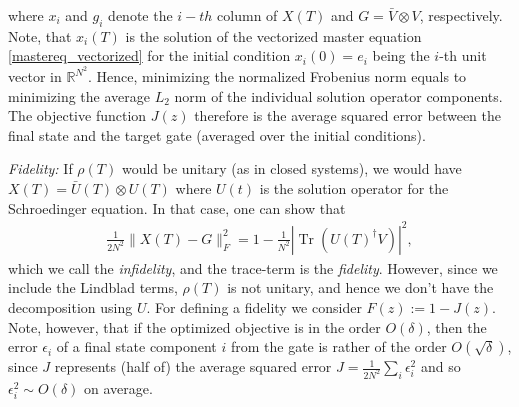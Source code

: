 \documentclass[letterpaper]{article}
\DeclareMathOperator{\Tr}{Tr}
\newcommand{\R}{\mathds{R}}
\newcommand{\C}{\mathds{C}}
\begin{document}
where $x_i$ and $g_i$ denote the $i-th$ column of $X(T)$ and $G=\bar V\otimes V$, respectively. Note, that $x_i(T)$ is the solution of the vectorized master equation \eqref{mastereq_vectorized} for the initial condition $x_i(0) = e_i$ being the $i$-th unit vector in $\R^{N^2}$. Hence, minimizing the normalized Frobenius norm equals to minimizing the average $L_2$ norm of the individual solution operator components. The objective function $J(z)$ therefore is the average squared error between the final state and the target gate (averaged over the initial conditions). 
 
\textit{Fidelity:} If $\rho(T)$ would be unitary (as in closed systems), we would have $X(T) = \bar U(T) \otimes U(T)$ where $U(t)$ is the solution operator for the Schroedinger equation. In that case, one can show that 
\begin{align}
  \frac{1}{2N^2}\|X(T) - G\|_F^2 = 1 - \frac{1}{N^2}|\Tr(U(T)^{\dagger}V)|^2,
\end{align}
which we call the \textit{infidelity}, and the trace-term is the \textit{fidelity}. However, since we include the Lindblad terms, $\rho(T)$ is not unitary, and hence we don't have the decomposition using $U$. For defining a fidelity we consider $F(z) := 1 - J(z)$. Note, however, that if the optimized objective is in the order $O(\delta)$, then the error $\epsilon_i$ of a final state component $i$ from the gate is rather of the order $O(\sqrt{\delta})$, since $J$ represents (half of) the average squared error $J = \frac{1}{2N^2}\sum_i \epsilon_i^2$ and so $\epsilon_i^2 \sim O(\delta)$ on average.

\end{document}
